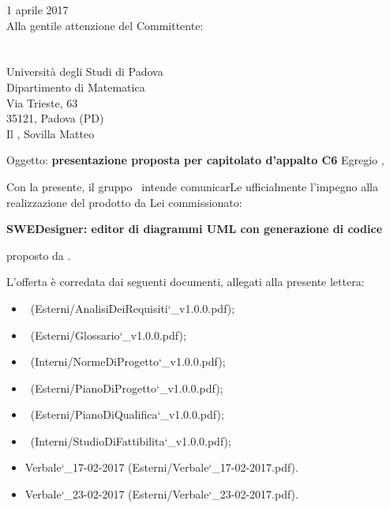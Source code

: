 \documentclass[a4paper,12pt]{article}
\author{KaleidosCode}
\date{01/04/2017}	%
\begin{document}
	\begin{titlepage}
		\centering
		\logo
		\vspace{1.2cm}
		1 aprile 2017\\
		\vspace{0.4cm}
		\flushright Alla gentile attenzione del Committente:\\
		\vardanega\\
		\cardin\\
		Università degli Studi di Padova\\
		Dipartimento di Matematica\\
		Via Trieste, 63\\
		35121, Padova (PD)\\
		\vspace{0.5cm}
		\vspace{1.4cm}
		\flushleft Il \responsabilediprogetto, Sovilla Matteo
		\par \kaleidoscode
		Oggetto: \textbf{presentazione proposta per capitolato d'appalto C6}
		\vspace{1cm}
		Egregio \vardanega,
		\vspace{0.4cm}
		\par Con la presente, il gruppo \kaleidoscode\ intende comunicarLe ufficialmente l'impegno alla realizzazione
		del prodotto da Lei commissionato:
		\begin{center}
			\textbf{SWEDesigner: editor di diagrammi UML con generazione di codice} 
		\end{center}
		proposto da \proponente.
		\par L'offerta è corredata dai seguenti documenti, allegati alla presente lettera:
		\begin{itemize}
			\item \analisideirequisitiv\ (Esterni/AnalisiDeiRequisiti\char`_v1.0.0.pdf);
			\item \glossariov\ (Esterni/Glossario\char`_v1.0.0.pdf);
			\item \normediprogettov\ (Interni/NormeDiProgetto\char`_v1.0.0.pdf);
			\item \pianodiprogettov\ (Esterni/PianoDiProgetto\char`_v1.0.0.pdf);
			\item \pianodiqualificav\ (Esterni/PianoDiQualifica\char`_v1.0.0.pdf);
			\item \studiodifattibilitav\ (Interni/StudioDiFattibilita\char`_v1.0.0.pdf);
			\item Verbale\char`_17-02-2017 (Esterni/Verbale\char`_17-02-2017.pdf).
			\item Verbale\char`_23-02-2017 (Esterni/Verbale\char`_23-02-2017.pdf).

\end{itemize}
\end{titlepage}
\end{document}
